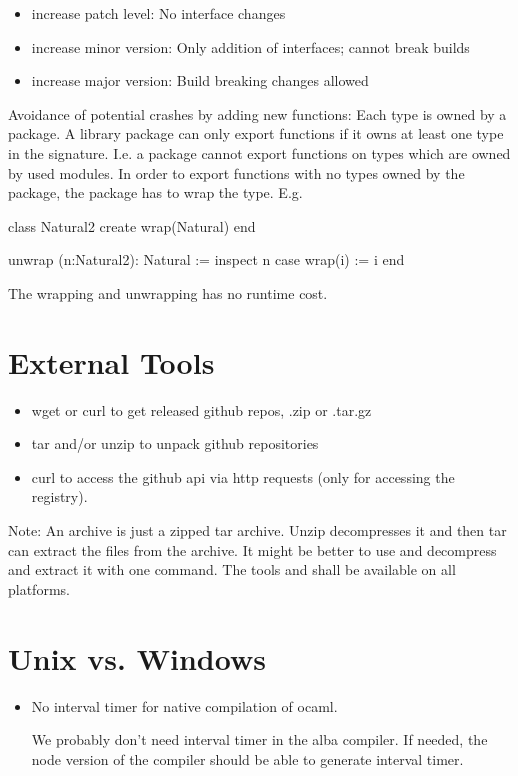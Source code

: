 \begin{itemize}
\item increase patch level: No interface changes
\item increase minor version: Only addition of interfaces; cannot break builds
\item increase major version: Build breaking changes allowed
\end{itemize}

Avoidance of potential crashes by adding new functions: Each type is owned by
a package. A library package can only export functions if it owns at least one
type in the signature. I.e. a package cannot export functions on types which
are owned by used modules. In order to export functions with no types owned by
the package, the package has to wrap the type. E.g.

\begin{alba}
class Natural2 create
    wrap(Natural)
end

unwrap (n:Natural2): Natural :=
    inspect n case
        wrap(i) := i
    end
\end{alba}
%
The wrapping and unwrapping has no runtime cost.


\section{External Tools}

\begin{itemize}
\item wget or curl to get released github repos, .zip or .tar.gz
\item tar and/or unzip to unpack github repositories
\item curl to access the github api via http requests (only for accessing the
  registry).
\end{itemize}

Note: An archive  is just a zipped tar archive. Unzip
decompresses it and then tar can extract the files from the archive. It might
be better to use  and decompress and extract it with one
command. The tools  and  shall be available on all
platforms.



\newpage
\section{Unix vs. Windows}

\begin{itemize}
\item No interval timer for native compilation of ocaml.

  We probably don't need interval timer in the alba compiler. If needed, the
  node version of the compiler should be able to generate interval timer.

\end{itemize}








